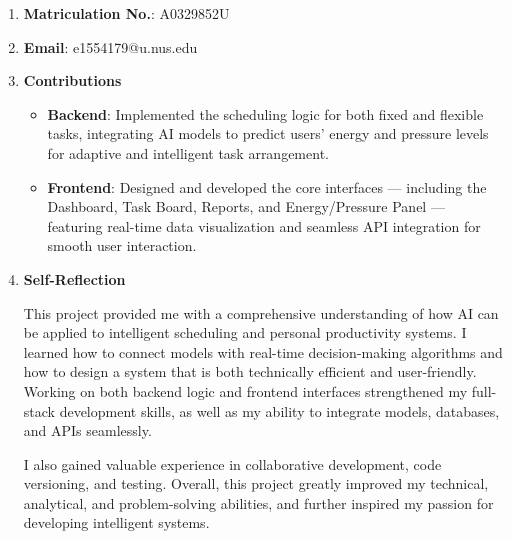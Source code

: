 \documentclass[12pt, a4paper]{article}
\begin{document}
    \begin{enumerate}
        \item \textbf{Matriculation No.}: A0329852U
        \item \textbf{Email}: e1554179@u.nus.edu
        \item \textbf{Contributions}

            \begin{itemize}
                \item \textbf{Backend}: Implemented the scheduling logic for both fixed and flexible tasks, integrating AI models to predict users’ energy and pressure levels for adaptive and intelligent task arrangement.
                \item \textbf{Frontend}: Designed and developed the core interfaces — including the Dashboard, Task Board, Reports, and Energy/Pressure Panel — featuring real-time data visualization and seamless API integration for smooth user interaction.
            \end{itemize}
        
        \item \textbf{Self-Reflection}

            This project provided me with a comprehensive understanding of how AI can be applied to intelligent scheduling and personal productivity systems. I learned how to connect models with real-time decision-making algorithms and how to design a system that is both technically efficient and user-friendly. Working on both backend logic and frontend interfaces strengthened my full-stack development skills, as well as my ability to integrate models, databases, and APIs seamlessly.
            
            I also gained valuable experience in collaborative development, code versioning, and testing. Overall, this project greatly improved my technical, analytical, and problem-solving abilities, and further inspired my passion for developing intelligent systems.
            
    \end{enumerate}

    
\end{document}
